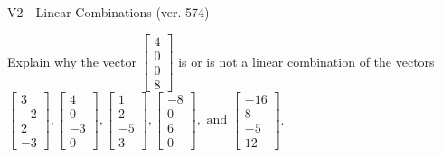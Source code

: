 \begin{exercise}
  \begin{exerciseTitle}V2 - Linear Combinations (ver. 574)\end{exerciseTitle}
  \begin{exerciseStatement}
    Explain why the vector \(\left[\begin{array}{c}
4 \\
0 \\
0 \\
8
\end{array}\right]\)  is or is not a linear 
	combination of the vectors \(\left[\begin{array}{c}
3 \\
-2 \\
2 \\
-3
\end{array}\right] , \left[\begin{array}{c}
4 \\
0 \\
-3 \\
0
\end{array}\right] , \left[\begin{array}{c}
1 \\
2 \\
-5 \\
3
\end{array}\right] , \left[\begin{array}{c}
-8 \\
0 \\
6 \\
0
\end{array}\right] , \text{ and } \left[\begin{array}{c}
-16 \\
8 \\
-5 \\
12
\end{array}\right]\).
	



\end{exerciseStatement}
\end{exercise}
